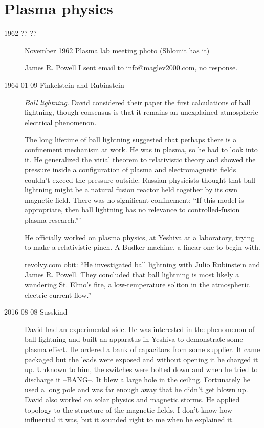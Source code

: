 \section{Plasma physics}
\label{sect:plasma}

\begin{description}

\item[1962-??-??]
November 1962 Plasma lab meeting photo (Shlomit has it)

 {James R. Powell}
I sent email to info@maglev2000.com, no response.

\item[1964-01-09 Finkelstein and Rubinstein] {\em Ball lightning}. 	David
considered their paper the first calculations of ball
lightning, though consensus is that it remains an unexplained
 {atmospheric
electrical phenomenon}.

The long lifetime of ball lightning suggested that perhaps there is a
confinement mechanism at work. He was in plasma, so he had to look into
it. He generalized the virial theorem to relativistic theory and showed
the pressure inside a configuration of plasma and electromagnetic fields
couldn't exceed the pressure outside. Russian physicists thought that
ball lightning might be a natural fusion reactor held together by its own
magnetic field. There was no significant confinement: ``If this model is
appropriate, then ball lightning has no relevance to controlled-fusion
plasma research.'''

He officially worked on plasma physics, at Yeshiva at a laboratory,
trying to make a relativistic pinch. A Budker machine, a linear one to
begin with.

{revolvy.com obit}:
``He investigated ball lightning with Julio Rubinstein and James R.
Powell. They concluded that ball lightning is most likely a wandering St.
Elmo's fire, a low-temperature soliton in the atmospheric electric
current flow.''

\item[2016-08-08 Susskind]
David had an experimental side. He was interested in the phenomenon of
ball lightning and built an apparatus in Yeshiva to demonstrate some
plasma effect. He ordered a bank of capacitors from some supplier. It
came packaged but the leads were exposed and without opening it he
charged it up. Unknown to him, the switches were bolted down and when he
tried to discharge it --BANG--. It blew a large hole in the ceiling.
Fortunately he used a long pole and was far enough away that he didn't
get blown up.
David also worked on solar physics and magnetic storms. He applied
topology to the structure of the magnetic fields. I don't know how
influential it was, but it sounded right to me when he explained it.


\end{description}
